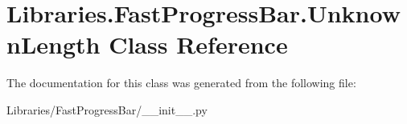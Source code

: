 \hypertarget{class_libraries_1_1_fast_progress_bar_1_1_unknown_length}{}\section{Libraries.\+Fast\+Progress\+Bar.\+Unknown\+Length Class Reference}
\label{class_libraries_1_1_fast_progress_bar_1_1_unknown_length}


The documentation for this class was generated from the following file\+:\begin{DoxyCompactItemize}
\item 
Libraries/\+Fast\+Progress\+Bar/\+\_\+\+\_\+init\+\_\+\+\_\+.\+py\end{DoxyCompactItemize}
